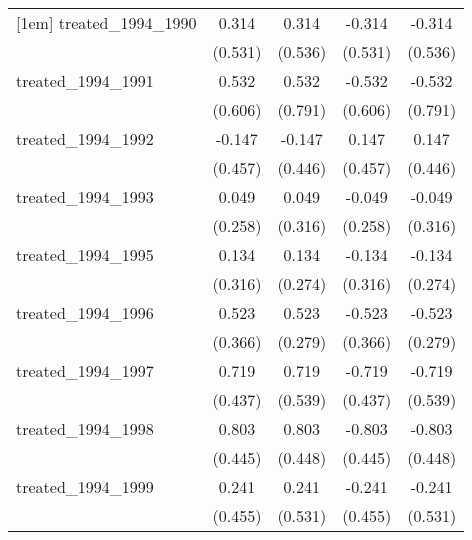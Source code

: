 {\begin{tabular}{l*{4}{c}}
[1em]
treated\_1994\_1990&       0.314         &       0.314         &      -0.314         &      -0.314         \\
            &     (0.531)         &     (0.536)         &     (0.531)         &     (0.536)         \\
[1em]
treated\_1994\_1991&       0.532         &       0.532         &      -0.532         &      -0.532         \\
            &     (0.606)         &     (0.791)         &     (0.606)         &     (0.791)         \\
[1em]
treated\_1994\_1992&      -0.147         &      -0.147         &       0.147         &       0.147         \\
            &     (0.457)         &     (0.446)         &     (0.457)         &     (0.446)         \\
[1em]
treated\_1994\_1993&       0.049         &       0.049         &      -0.049         &      -0.049         \\
            &     (0.258)         &     (0.316)         &     (0.258)         &     (0.316)         \\
[1em]
treated\_1994\_1995&       0.134         &       0.134         &      -0.134         &      -0.134         \\
            &     (0.316)         &     (0.274)         &     (0.316)         &     (0.274)         \\
[1em]
treated\_1994\_1996&       0.523         &       0.523         &      -0.523         &      -0.523         \\
            &     (0.366)         &     (0.279)         &     (0.366)         &     (0.279)         \\
[1em]
treated\_1994\_1997&       0.719         &       0.719         &      -0.719         &      -0.719         \\
            &     (0.437)         &     (0.539)         &     (0.437)         &     (0.539)         \\
[1em]
treated\_1994\_1998&       0.803         &       0.803         &      -0.803         &      -0.803         \\
            &     (0.445)         &     (0.448)         &     (0.445)         &     (0.448)         \\
[1em]
treated\_1994\_1999&       0.241         &       0.241         &      -0.241         &      -0.241         \\
            &     (0.455)         &     (0.531)         &     (0.455)         &     (0.531)         \\

\end{tabular}}
